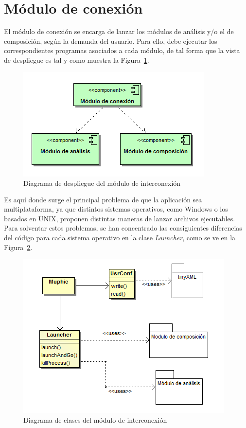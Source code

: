 \section{Módulo de conexión}
\label{sec:arqMuphic}

El módulo de conexión se encarga de lanzar los módulos de análisis y/o el de composición, según la demanda del usuario. Para ello, debe ejecutar los correspondientes programas asociados a cada módulo, de tal forma que la vista de despliegue es tal y como muestra la Figura~\ref{fig:muphic-deploy-diagram}.\\


		\begin{figure}[!htbp]
		\centering
		\includegraphics[scale=0.6]{graphics/muphic-deploy-diagram.png}
		\caption{Diagrama de despliegue del módulo de interconexión}
		\label{fig:muphic-deploy-diagram}
		\end{figure}
		
Es aquí donde surge el principal problema de que la aplicación sea multiplataforma, ya que distintos sistemas operativos, como Windows o los basados en UNIX, proponen distintas maneras de lanzar archivos ejecutables. Para solventar estos problemas, se han concentrado las consiguientes diferencias del código para cada sistema operativo en la clase \emph{Launcher}, como se ve en la Figura~\ref{fig:muphic-class-diagram}.\\

		\begin{figure}[!htbp]
		\centering
		\includegraphics[scale=0.6]{graphics/muphic-class-diagram.png}
		\caption{Diagrama de clases del módulo de interconexión}
		\label{fig:muphic-class-diagram}
		\end{figure}
		
